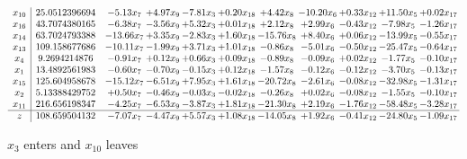 \documentclass[9pt]{article}
\begin{document}
 \[\begin{array}{c| c c@{\hskip 2pt} c@{\hskip 2pt} c@{\hskip 2pt} c@{\hskip 2pt} c@{\hskip 2pt} c@{\hskip 2pt} c@{\hskip 2pt} c@{\hskip 2pt} c@{\hskip 2pt} }
 x_{10}   &  25.0512396694 & -5.13 x_{7} & +  4.97 x_{9} & -7.81 x_{3} & +  0.20 x_{18} & +  4.42 x_{8} & -10.20 x_{6} & +  0.33 x_{12} & + 11.50 x_{5} & +  0.02 x_{17}\\
 x_{16}   &  43.7074380165 & -6.38 x_{7} & -3.56 x_{9} & +  5.32 x_{3} & +  0.01 x_{18} & +  2.12 x_{8} & +  2.99 x_{6} & -0.43 x_{12} & -7.98 x_{5} & -1.26 x_{17}\\
 x_{14}   &  63.7024793388 & -13.66 x_{7} & +  3.35 x_{9} & -2.83 x_{3} & +  1.60 x_{18} & -15.76 x_{8} & +  8.40 x_{6} & +  0.06 x_{12} & -13.99 x_{5} & -0.55 x_{17}\\
 x_{13}   &  109.158677686 & -10.11 x_{7} & -1.99 x_{9} & +  3.71 x_{3} & +  1.01 x_{18} & -0.86 x_{8} & -5.01 x_{6} & -0.50 x_{12} & -25.47 x_{5} & -0.64 x_{17}\\
 x_{4}   &  9.2694214876 & -0.91 x_{7} & +  0.12 x_{9} & +  0.66 x_{3} & +  0.09 x_{18} & -0.89 x_{8} & -0.09 x_{6} & +  0.02 x_{12} & -1.77 x_{5} & -0.10 x_{17}\\
 x_{1}   &  13.4892561983 & -0.60 x_{7} & -0.70 x_{9} & -0.15 x_{3} & +  0.12 x_{18} & -1.57 x_{8} & -0.12 x_{6} & -0.12 x_{12} & -3.70 x_{5} & -0.13 x_{17}\\
 x_{15}   &  125.604958678 & -15.12 x_{7} & -6.51 x_{9} & +  7.95 x_{3} & +  1.61 x_{18} & -20.72 x_{8} & -2.61 x_{6} & -0.08 x_{12} & -32.98 x_{5} & -1.31 x_{17}\\
 x_{2}   &  5.13388429752 & +  0.50 x_{7} & -0.46 x_{9} & -0.03 x_{3} & -0.02 x_{18} & -0.26 x_{8} & +  0.02 x_{6} & -0.08 x_{12} & -1.55 x_{5} & -0.10 x_{17}\\
 x_{11}   &  216.656198347 & -4.25 x_{7} & -6.53 x_{9} & -3.87 x_{3} & +  1.81 x_{18} & -21.30 x_{8} & +  2.19 x_{6} & -1.76 x_{12} & -58.48 x_{5} & -3.28 x_{17}\\
\hline
z    &  108.659504132 & -7.07 x_{7} & -4.47 x_{9} & +  5.57 x_{3} & +  1.08 x_{18} & -14.05 x_{8} & +  1.92 x_{6} & -0.41 x_{12} & -24.80 x_{5} & -1.09 x_{17}\\
\end{array}\]


 $ x_{3} $ enters and $ x_{10} $ leaves 
\end{document}
